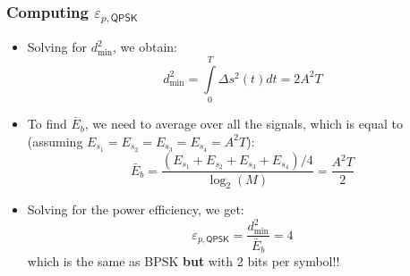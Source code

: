 \documentclass[10pt]{beamer}
\begin{document}
\frame
{
  \frametitle{Computing $\varepsilon_{p,\mathsf{QPSK}}$}

    \begin{itemize}
       \item Solving for $d_{\min}^2$, we obtain:
        \begin{equation}
            d_{\min}^2=\int\limits_{0}^{T}\Delta{s^2(t)}dt=2A^2T
        \end{equation}
       \item To find $\bar{E}_b$, we need to average over all the signals, which is equal to (assuming $E_{s_1}=E_{s_2}=E_{s_3}=E_{s_4}=A^2T$):
         \begin{equation}
            \bar{E}_b=\frac{(E_{s_1}+E_{s_2}+E_{s_3}+E_{s_4})/4}{\log_2(M)}=\frac{A^2T}{2}
         \end{equation}
       \item Solving for the power efficiency, we get:
       \begin{equation}
        \varepsilon_{p,\mathsf{QPSK}}=\frac{d_{\min}^2}{\bar{E}_b}=4
       \end{equation}
       which is the same as BPSK {\bf but} with 2 bits per symbol!!
    \end{itemize}

}
\end{document}
